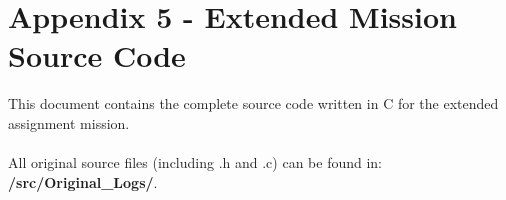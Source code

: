 \documentclass[12pt]{article}
\begin{document}
\section*{Appendix 5 - Extended Mission Source Code}

This document contains the complete source code written in C for the extended assignment mission.\\\\
All original source files (including .h and .c) can be found in: \textbf{/src/Original\_Logs/}.
\end{document}
